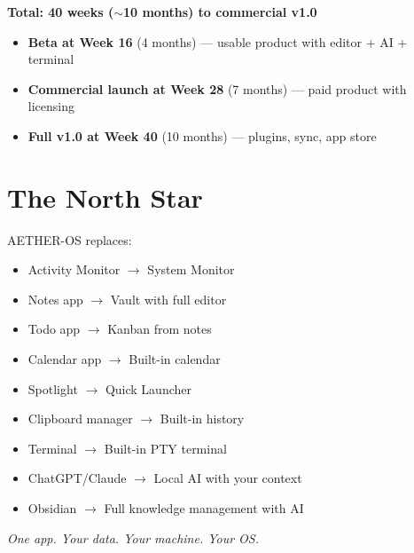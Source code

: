 \documentclass[11pt,a4paper]{article}
\begin{document}
\vspace{0.5cm}
\textbf{Total: 40 weeks ($\sim$10 months) to commercial v1.0}

\begin{itemize}[noitemsep]
  \item \textbf{Beta at Week 16} (4 months) --- usable product with editor + AI + terminal
  \item \textbf{Commercial launch at Week 28} (7 months) --- paid product with licensing
  \item \textbf{Full v1.0 at Week 40} (10 months) --- plugins, sync, app store
\end{itemize}

\section{The North Star}

AETHER-OS replaces:

\begin{itemize}[noitemsep]
  \item Activity Monitor $\rightarrow$ System Monitor
  \item Notes app $\rightarrow$ Vault with full editor
  \item Todo app $\rightarrow$ Kanban from notes
  \item Calendar app $\rightarrow$ Built-in calendar
  \item Spotlight $\rightarrow$ Quick Launcher
  \item Clipboard manager $\rightarrow$ Built-in history
  \item Terminal $\rightarrow$ Built-in PTY terminal
  \item ChatGPT/Claude $\rightarrow$ Local AI with your context
  \item Obsidian $\rightarrow$ Full knowledge management with AI
\end{itemize}

\vspace{1cm}
\begin{center}
\Large\textit{One app. Your data. Your machine. Your OS.}
\end{center}
\end{document}
